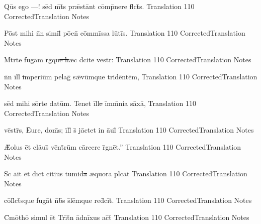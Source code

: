\documentclass[]{book}
\begin{document}
\latline
  {Qu\={}s \-eg\-o ---! s\=ed m\={}t\={}s pr\={\ae}st\=ant c\=omp\={}n\-er\-e fl\={}ct\={}s.}
  { Translation }
  {110}
  { CorrectedTranslation }
  { Notes }



\newpage

\latline
  {P\=ost m\-ih\-i n\={}n s\-im\-il\={\macron {\i}} p\={oe}n\={} c\=omm\=iss\-a l\-u\={}t\=is.}
  { Translation }
  {110}
  { CorrectedTranslation }
  { Notes }


\latline
  {M\={}t\={}r\={}t\-e f\-ug\=am r\={}g\={\macron {\i}}qu\sout{e h}\={\ae}c d\={\macron {\i}}c\-it\-e v\=estr\={}:}
  { Translation }
  {110}
  { CorrectedTranslation }
  { Notes }


\latline
  {n\={}n \=ill\={\macron {\i}}\sout{ i}mp\-er\-i\=um p\-el\-ag\={\macron {\i}} s\={\ae}v\=umqu\-e tr\-id\=ent\=em,}
  { Translation }
  {110}
  { CorrectedTranslation }
  { Notes }



\newpage

\latline
  {s\=ed m\-ih\-i s\=ort\-e d\-at\=um.  T\-en\-et \=ill\sout{e }\=imm\={}n\-i\-a s\=ax\=a,}
  { Translation }
  {110}
  { CorrectedTranslation }
  { Notes }


\latline
  {v\=estr\={}s, \={Eu}r\-e, d\-om\={}s; \=ill\={} s\={} j\=act\-et \-in \={au}l\={}}
  { Translation }
  {110}
  { CorrectedTranslation }
  { Notes }


\latline
  {\={\AE}\-ol\-us \=et cl\={au}s\={} v\=ent\={}r\=um c\=arc\-er\-e r\={}gn\=et.''}
  { Translation }
  {110}
  { CorrectedTranslation }
  { Notes }



\newpage

\latline
  {S\={\macron {\i}}c \={ai}t \=et d\=ict\={} c\-it\-i\=us t\-um\-id\sout{a }\={\ae}qu\-or\-a pl\={}c\=at}
  { Translation }
  {110}
  { CorrectedTranslation }
  { Notes }


\latline
  {c\=oll\={}ct\={}squ\-e f\-ug\=at n\={}b\={}s s\={}l\=emqu\-e r\-ed\={}c\=it.}
  { Translation }
  {110}
  { CorrectedTranslation }
  { Notes }


\latline
  {C\={}m\=otho\={} s\-im\-ul \=et Tr\={\i}t\={}n \=adn\=ix\-us \-ac\={}t\={}}
  { Translation }
  {110}
  { CorrectedTranslation }
  { Notes }
\end{document}
